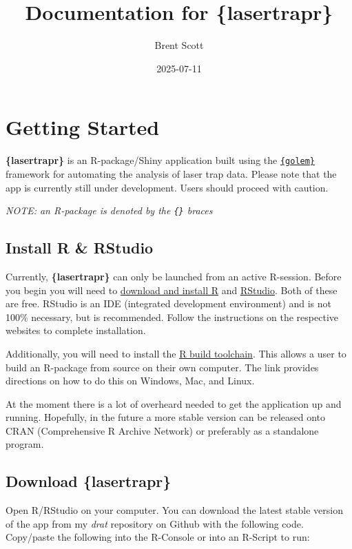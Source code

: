 \documentclass[
]{book}
\title{Documentation for \textbf{\{lasertrapr\}}}
\author{Brent Scott}
\date{2025-07-11}
\begin{document}
\maketitle

{
\setcounter{tocdepth}{1}
\tableofcontents
}
\chapter{Getting Started}\label{getting-started}

\textbf{\{lasertrapr\}} is an R-package/Shiny application built using the \href{https://golemverse.org/}{\texttt{\{golem\}}} framework for automating the analysis of laser trap data. Please note that the app is currently still under development. Users should proceed with caution.

\emph{NOTE: an R-package is denoted by the \texttt{\{\}} braces}

\section{Install R \& RStudio}\label{install-r-rstudio}

Currently, \textbf{\{lasertrapr\}} can only be launched from an active R-session. Before you begin you will need to \href{https://cloud.r-project.org/}{download and install R} and \href{https://www.rstudio.com/products/rstudio/download/\#download}{RStudio}. Both of these are free. RStudio is an IDE (integrated development environment) and is not 100\% necessary, but is recommended. Follow the instructions on the respective websites to complete installation.

Additionally, you will need to install the \href{https://r-pkgs.org/setup.html\#setup-tools}{R build toolchain}. This allows a user to build an R-package from source on their own computer. The link provides directions on how to do this on Windows, Mac, and Linux.

At the moment there is a lot of overheard needed to get the application up and running. Hopefully, in the future a more stable version can be released onto CRAN (Comprehensive R Archive Network) or preferably as a standalone program.

\section{\texorpdfstring{Download \textbf{\{lasertrapr\}}}{Download \{lasertrapr\}}}\label{download-lasertrapr}

Open R/RStudio on your computer. You can download the latest stable version of the app from my \emph{drat} repository on Github with the following code. Copy/paste the following into the R-Console or into an R-Script to run:
\end{document}

